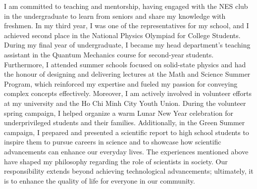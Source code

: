 \documentclass[a4paper]{article}
\begin{document}
I am committed to teaching and mentorship, having engaged with the NES club in the undergraduate to learn from seniors and share my knowledge with freshmen. In my third year, I was one of the representatives for my school, and I achieved second place in the National Physics Olympiad for College Students. During my final year of undergraduate, I became my head department's teaching assistant in the Quantum Mechanics course for second-year students. Furthermore, I attended summer schools focused on solid-state physics and had the honour of designing and delivering lectures at the Math and Science Summer Program, which reinforced my expertise and fueled my passion for conveying complex concepts effectively. Moreover, I am actively involved in volunteer efforts at my university and the Ho Chi Minh City Youth Union. During the volunteer spring campaign, I helped organize a warm Lunar New Year celebration for underprivileged students and their families. Additionally, in the Green Summer campaign, I prepared and presented a scientific report to high school students to inspire them to pursue careers in science and to showcase how scientific advancements can enhance our everyday lives. The experiences mentioned above have shaped my philosophy regarding the role of scientists in society. Our responsibility extends beyond achieving technological advancements; ultimately, it is to enhance the quality of life for everyone in our community.\\\null\quad
\end{document}
